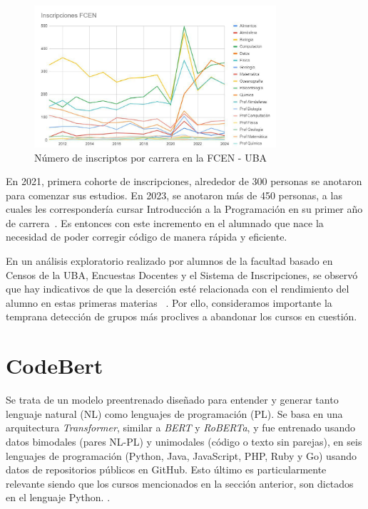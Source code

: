 \documentclass[11pt,a4paper,twoside,openany]{tesis}
\begin{document}
\begin{figure}[H]
    \centering
    \includegraphics[width=0.8\textwidth]{imagenes/inscriptos-por-carrera.jpg}
    \caption{Número de inscriptos por carrera en la FCEN - UBA ~\cite{DOV}}
\end{figure}

En 2021, primera cohorte de inscripciones, alrededor de 300 personas se anotaron para comenzar sus estudios. En 2023, se anotaron más de 450 personas, a las cuales les correspondería cursar Introducción a la Programación en su primer año de carrera~\cite{primeros-datos}. Es entonces con este incremento en el alumnado que nace la necesidad de poder corregir código de manera rápida y eficiente. 

En un análisis exploratorio realizado por alumnos de la facultad basado en Censos de la UBA, Encuestas Docentes y el Sistema de Inscripciones, se observó que hay indicativos de que la deserción esté relacionada con el rendimiento del alumno en estas primeras materias ~\cite{analisis-exploratorio}. Por ello, consideramos importante la temprana detección de grupos más proclives a abandonar los cursos en cuestión. 

\section{CodeBert}

Se trata de un modelo preentrenado diseñado para entender y generar tanto lenguaje natural (NL) como lenguajes de programación (PL). Se basa en una arquitectura \emph{Transformer}, similar a \emph{BERT} y \emph{RoBERTa}, y fue entrenado usando datos bimodales (pares NL-PL) y unimodales (código o texto sin parejas), en seis lenguajes de programación (Python, Java, JavaScript, PHP, Ruby y Go) usando datos de repositorios públicos en GitHub. Esto último es particularmente relevante siendo que los cursos mencionados en la sección anterior, son dictados en el lenguaje Python.  . 
\end{document}
